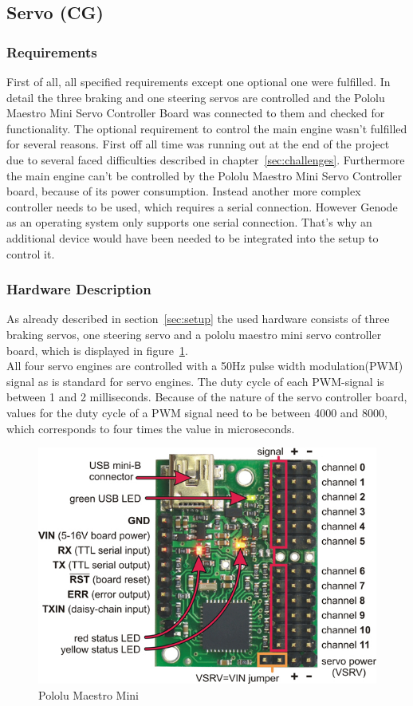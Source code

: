 \subsection{Servo (CG)}
\label{sec:servo}

\subsubsection{Requirements}
First of all, all specified requirements except one optional one were fulfilled. In detail the three braking and one steering servos are controlled and the Pololu Maestro Mini Servo Controller Board was connected to them and checked for functionality. The optional requirement to control the main engine wasn't fulfilled for several reasons. First off all time was running out at the end of the project due to several faced difficulties described in chapter~\ref{sec:challenges}. Furthermore the main engine can't be controlled by the Pololu Maestro Mini Servo Controller board, because of its power consumption. Instead another more complex controller needs to be used, which requires a serial connection. However Genode as an operating system only supports one serial connection. That's why an additional device would have been needed to be integrated into the setup to control it.

\subsubsection{Hardware Description}
As already described in section~\ref{sec:setup} the used hardware consists of three braking servos, one steering servo and a pololu maestro mini servo controller board, which is displayed in figure~\ref{fig:pololu}.\\

All four servo engines are controlled with a 50Hz pulse width modulation(PWM) signal as is standard for servo engines. The duty cycle of each PWM-signal is between 1 and 2 milliseconds. Because of the nature of the servo controller board, values for the duty cycle of a PWM signal need to be between 4000 and 8000, which corresponds to four times the value in microseconds.\\

\begin{figure}[h!tb]
	\centering
    \includegraphics[width=0.7\linewidth]{images/pololu}
    \caption{Pololu Maestro Mini}
    \label{fig:pololu}
\end{figure}

